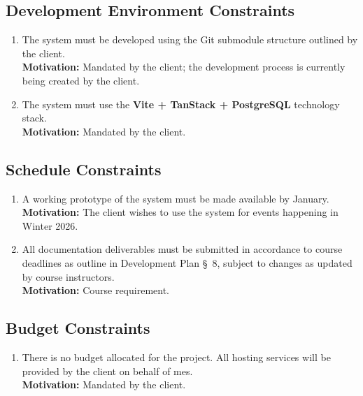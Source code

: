 \documentclass[12pt]{article}
\begin{document}
\subsection{Development Environment Constraints}
\begin{enumerate}[align=left,
  leftmargin=*,
  labelsep=1em,
  itemindent=0em,
  label=\bfseries DEC-\arabic*:]
  \item The system must be developed using the Git submodule structure outlined by the client.\\[2mm]
    {\bf Motivation:} Mandated by the client; the development process is currently being created by the client.
  \item The system must use the {\bf Vite + TanStack + PostgreSQL} technology stack.\\[2mm]
    {\bf Motivation:} Mandated by the client.
\end{enumerate}

\subsection{Schedule Constraints}
\begin{enumerate}[align=left,
  leftmargin=*,
  labelsep=1em,
  itemindent=0em,
  label=\bfseries SCC-\arabic*:]
  \item A working prototype of the system must be made available by January.\\[2mm]
    {\bf Motivation:} The client wishes to use the system for events happening in Winter 2026.
  \item All documentation deliverables must be submitted in accordance to course deadlines as outline in Development
    Plan \S \ 8, subject to changes as updated by course instructors.\\[2mm]
    {\bf Motivation:} Course requirement.
\end{enumerate}

\subsection{Budget Constraints}
\begin{enumerate}[align=left,
  leftmargin=*,
  labelsep=1em,
  itemindent=0em,
  label=\bfseries BGC-\arabic*:]
  \item There is no budget allocated for the project. All hosting services will be provided by the client on behalf of
    \gls{mes}.\\[2mm]
    {\bf Motivation:} Mandated by the client.
\end{enumerate}
\end{document}
